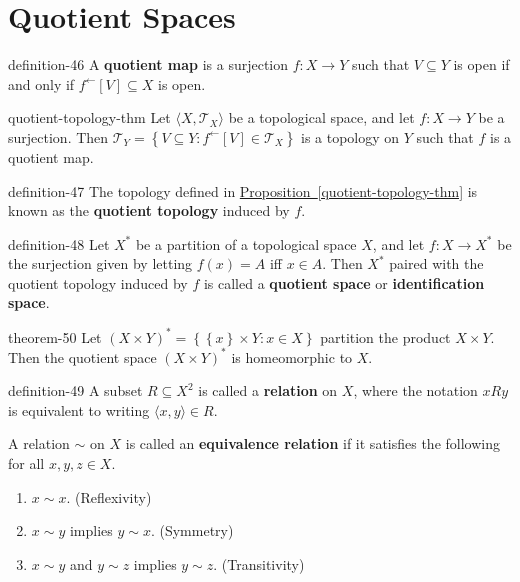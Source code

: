 \documentclass[10pt,]{article}
\newcommand{\terminology}[1]{\textbf{#1}}
\newcommand{\tuple}[1]{\langle #1 \rangle}
\newcommand{\mc}{\mathcal}
\newcommand{\setBuilder}[2]{\left\{#1:#2\right\}}
\newcommand{\setList}[1]{\left\{#1\right\}}
\begin{document}
\section[{Quotient Spaces}]{Quotient Spaces}\label{section-quotient}
\begin{definition}{}{definition-46}%
\hypertarget{p-188}{}%
A \terminology{quotient map} is a surjection \(f:X\to Y\) such that \(V\subseteq Y\) is open if and only if \(f^\leftarrow[V]\subseteq X\) is open.%
\end{definition}
\begin{proposition}{}{}{quotient-topology-thm}%
\hypertarget{p-189}{}%
Let \(\tuple{X,\mc T_X}\) be a topological space, and let \(f:X\to Y\) be a surjection. Then \(\mc T_Y=\setBuilder{V\subseteq Y}{f^\leftarrow[V]\in\mc T_X}\) is a topology on \(Y\) such that \(f\) is a quotient map.%
\end{proposition}
\begin{definition}{}{definition-47}%
\hypertarget{p-190}{}%
The topology defined in \hyperref[quotient-topology-thm]{Proposition~\ref{quotient-topology-thm}} is known as the \terminology{quotient topology} induced by \(f\).%
\end{definition}
\begin{definition}{}{definition-48}%
\hypertarget{p-191}{}%
Let \(X^*\) be a partition of a topological space \(X\), and let \(f:X\to X^*\) be the surjection given by letting \(f(x)=A\) iff \(x\in A\). Then \(X^*\) paired with the quotient topology induced by \(f\) is called a \terminology{quotient space} or \terminology{identification space}.%
\end{definition}
\begin{theorem}{}{}{theorem-50}%
\hypertarget{p-192}{}%
Let \((X\times Y)^*=\setBuilder{\setList{x}\times Y}{x\in X}\) partition the product \(X\times Y\). Then the quotient space \((X\times Y)^*\) is homeomorphic to \(X\).%
\end{theorem}
\begin{definition}{}{definition-49}%
\hypertarget{p-193}{}%
A subset \(R\subseteq X^2\) is called a \terminology{relation} on \(X\), where the notation \(xRy\) is equivalent to writing \(\tuple{x,y}\in R\).%
\par
\hypertarget{p-194}{}%
A relation \(\sim\) on \(X\) is called an \terminology{equivalence relation} if it satisfies the following for all \(x,y,z\in X\).%
\leavevmode%
\begin{enumerate}
\item\hypertarget{li-116}{}\(x\sim x\). (Reflexivity)%
\item\hypertarget{li-117}{}\(x\sim y\) implies \(y\sim x\). (Symmetry)%
\item\hypertarget{li-118}{}\(x\sim y\) and \(y\sim z\) implies \(y\sim z\). (Transitivity)%
\end{enumerate}
\end{definition}
\end{document}
